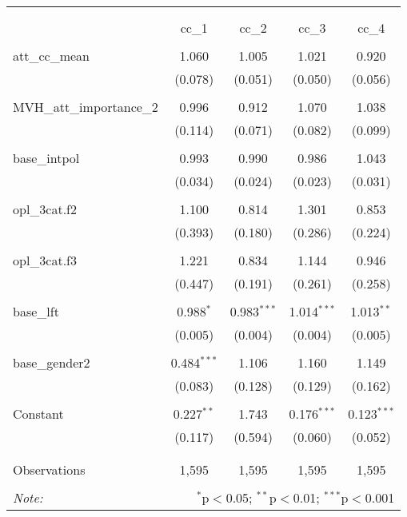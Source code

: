 
\begin{table}[!htbp] \centering 
  \caption{} 
  \label{} 
\begin{tabular}{@{\extracolsep{5pt}}lcccc} 
\\[-1.8ex]\hline 
\hline \\[-1.8ex] 
\\[-1.8ex] & cc\_1 & cc\_2 & cc\_3 & cc\_4 \\ 
\hline \\[-1.8ex] 
 att\_cc\_mean & 1.060 & 1.005 & 1.021 & 0.920 \\ 
  & (0.078) & (0.051) & (0.050) & (0.056) \\ 
  & & & & \\ 
 MVH\_att\_importance\_2 & 0.996 & 0.912 & 1.070 & 1.038 \\ 
  & (0.114) & (0.071) & (0.082) & (0.099) \\ 
  & & & & \\ 
 base\_intpol & 0.993 & 0.990 & 0.986 & 1.043 \\ 
  & (0.034) & (0.024) & (0.023) & (0.031) \\ 
  & & & & \\ 
 opl\_3cat.f2 & 1.100 & 0.814 & 1.301 & 0.853 \\ 
  & (0.393) & (0.180) & (0.286) & (0.224) \\ 
  & & & & \\ 
 opl\_3cat.f3 & 1.221 & 0.834 & 1.144 & 0.946 \\ 
  & (0.447) & (0.191) & (0.261) & (0.258) \\ 
  & & & & \\ 
 base\_lft & 0.988$^{*}$ & 0.983$^{***}$ & 1.014$^{***}$ & 1.013$^{**}$ \\ 
  & (0.005) & (0.004) & (0.004) & (0.005) \\ 
  & & & & \\ 
 base\_gender2 & 0.484$^{***}$ & 1.106 & 1.160 & 1.149 \\ 
  & (0.083) & (0.128) & (0.129) & (0.162) \\ 
  & & & & \\ 
 Constant & 0.227$^{**}$ & 1.743 & 0.176$^{***}$ & 0.123$^{***}$ \\ 
  & (0.117) & (0.594) & (0.060) & (0.052) \\ 
  & & & & \\ 
\hline \\[-1.8ex] 
Observations & 1,595 & 1,595 & 1,595 & 1,595 \\ 
\hline 
\hline \\[-1.8ex] 
\textit{Note:}  & \multicolumn{4}{r}{$^{*}$p$<$0.05; $^{**}$p$<$0.01; $^{***}$p$<$0.001} \\ 
\end{tabular} 
\end{table} 
